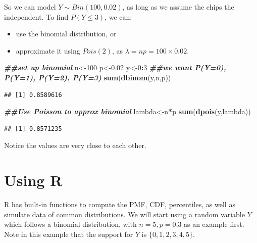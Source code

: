 \documentclass[
]{book}
\newenvironment{Shaded}{\begin{snugshade}}{\end{snugshade}}
\newcommand{\DecValTok}[1]{\textcolor[rgb]{0.00,0.00,0.81}{#1}}
\newcommand{\DocumentationTok}[1]{\textcolor[rgb]{0.56,0.35,0.01}{\textbf{\textit{#1}}}}
\newcommand{\FloatTok}[1]{\textcolor[rgb]{0.00,0.00,0.81}{#1}}
\newcommand{\FunctionTok}[1]{\textcolor[rgb]{0.13,0.29,0.53}{\textbf{#1}}}
\newcommand{\NormalTok}[1]{#1}
\newcommand{\OtherTok}[1]{\textcolor[rgb]{0.56,0.35,0.01}{#1}}
\newcommand{\SpecialCharTok}[1]{\textcolor[rgb]{0.81,0.36,0.00}{\textbf{#1}}}
\providecommand{\tightlist}{%
  \setlength{\itemsep}{0pt}\setlength{\parskip}{0pt}}
\begin{document}
So we can model \(Y \sim Bin(100,0.02)\), as long as we assume the chips the independent. To find \(P(Y \leq 3)\), we can:

\begin{itemize}
\tightlist
\item
  use the binomial distribution, or
\item
  approximate it using \(Pois(2)\), as \(\lambda = np = 100 \times 0.02\).
\end{itemize}

\begin{Shaded}
\begin{Highlighting}[]
\DocumentationTok{\#\#set up binomial}
\NormalTok{n}\OtherTok{\textless{}{-}}\DecValTok{100} 
\NormalTok{p}\OtherTok{\textless{}{-}}\FloatTok{0.02} 
\NormalTok{y}\OtherTok{\textless{}{-}}\DecValTok{0}\SpecialCharTok{:}\DecValTok{3} \DocumentationTok{\#\#we want P(Y=0), P(Y=1), P(Y=2), P(Y=3)}
\FunctionTok{sum}\NormalTok{(}\FunctionTok{dbinom}\NormalTok{(y,n,p))}
\end{Highlighting}
\end{Shaded}

\begin{verbatim}
## [1] 0.8589616
\end{verbatim}

\begin{Shaded}
\begin{Highlighting}[]
\DocumentationTok{\#\#Use Poisson to approx binomial}
\NormalTok{lambda}\OtherTok{\textless{}{-}}\NormalTok{n}\SpecialCharTok{*}\NormalTok{p}
\FunctionTok{sum}\NormalTok{(}\FunctionTok{dpois}\NormalTok{(y,lambda))}
\end{Highlighting}
\end{Shaded}

\begin{verbatim}
## [1] 0.8571235
\end{verbatim}

Notice the values are very close to each other.

\hypertarget{Rdis}{%
\section{Using R}\label{Rdis}}

R has built-in functions to compute the PMF, CDF, percentiles, as well as simulate data of common distributions. We will start using a random variable \(Y\) which follows a binomial distribution, with \(n=5, p = 0.3\) as an example first. Note in this example that the support for \(Y\) is \(\{0,1,2,3,4,5 \}\).
\end{document}
